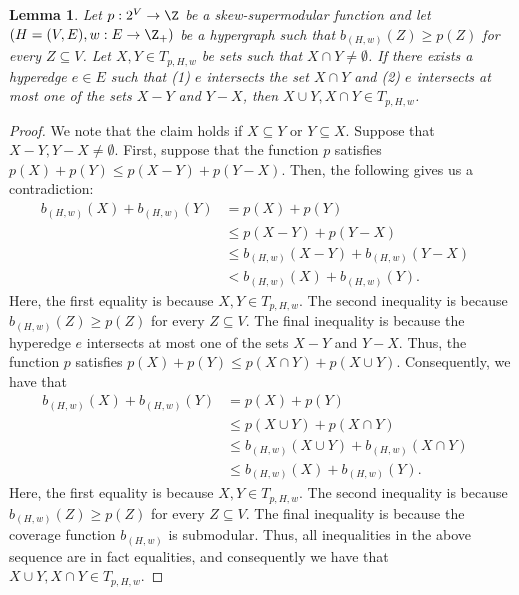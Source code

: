 \documentclass{article}
\newtheorem{lemma}{Lemma}[section]
\newcommand{\tightSetFamily}[1]{\ensuremath{T_{#1}}\xspace}
\begin{document}
\begin{lemma}\label{lem:weak-to-strong:uncrossing:uncrossing-lemma}
Let $p:2^V\rightarrow\Z$ be a skew-supermodular function and let $\left(H = (V, E), w:E \rightarrow\Z_+\right)$ be a hypergraph such that $b_{(H,w)}(Z) \geq p(Z)$ for every $Z \subseteq V$. Let $X, Y \in \tightSetFamily{p, H, w}$ be sets such that $X\cap Y \not = \emptyset$.
If there exists a hyperedge $e \in E$ such that (1) $e$ intersects the set $X\cap Y$ and 
(2) $e$ intersects at most one of the sets $X - Y$ and $Y - X$, then $X\cup Y, X \cap Y \in \tightSetFamily{p, H, w}$.
\end{lemma}
\begin{proof}
We note that the claim holds if $X\subseteq Y$ or $Y \subseteq X$. Suppose that $X - Y, Y - X \not= \emptyset$. First, suppose that the function $p$ satisfies $p(X) + p(Y) \leq p(X - Y) + p(Y - X)$. Then, the following gives us a contradiction:
\begin{align*}
    b_{(H,w)}(X) + b_{(H,w)}(Y) 
    &= p(X) + p(Y) &\\
    & \leq p(X - Y) + p(Y - X) & \\
    & \leq b_{(H,w)}(X - Y) + b_{(H,w)}(Y - X) & \\
    & < b_{(H,w)}(X) + b_{(H,w)}(Y).
\end{align*}
Here, the first equality is because $X, Y \in \tightSetFamily{p, H, w}$. The second inequality is because $b_{(H,w)}(Z) \geq p(Z)$ for every $Z\subseteq V$. The final inequality is because the hyperedge $e$ intersects at most one of the sets $X - Y$ and $Y - X$.
Thus, the function $p$ satisfies $p(X) + p(Y) \leq p(X\cap Y) + p(X \cup Y)$. Consequently, we have that
\begin{align*}
    b_{(H,w)}(X) + b_{(H,w)}(Y) 
    &= p(X) + p(Y) &\\
    & \leq p(X \cup Y) + p(X \cap Y) &\\
    & \leq b_{(H,w)}(X\cup Y) + b_{(H,w)}(X\cap Y) &\\
    & \leq b_{(H,w)}(X) + b_{(H,w)}(Y).&
\end{align*}
Here, the first equality is because $X, Y \in \tightSetFamily{p, H, w}$. The second inequality is because $b_{(H,w)}(Z) \geq p(Z)$ for every $Z\subseteq V$. The final inequality is because the coverage function $b_{(H, w)}$ is submodular. Thus, all inequalities in the above sequence are in fact equalities, and consequently we have that $X\cup Y, X\cap Y \in \tightSetFamily{p, H, w}$.
\end{proof}
\end{document}

